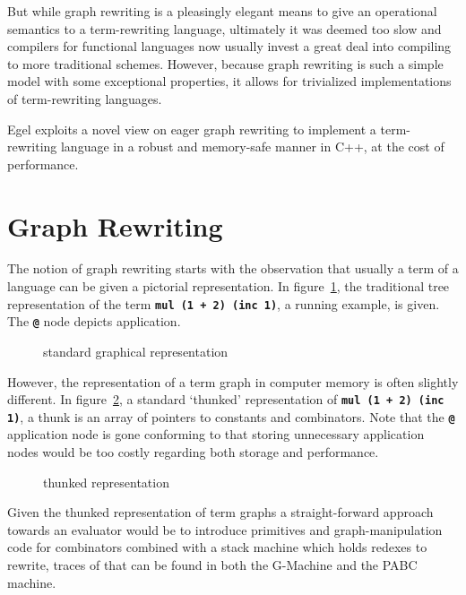 \documentclass{research4cacm}
\newcommand{\code}[1]{{\bf\texttt{#1}}}
\begin{document}
But while graph rewriting is a pleasingly elegant means to give an
operational semantics to a term-rewriting language, ultimately it
was deemed too slow and compilers for functional languages now
usually invest a great deal into compiling to more traditional
schemes.
However, because graph rewriting is such a simple model with
some exceptional properties, it allows for trivialized implementations
of term-rewriting languages.

Egel exploits a novel view on eager graph rewriting to implement
a term-rewriting language in a robust and memory-safe manner in
C++, at the cost of performance.

\section{Graph Rewriting}

The notion of graph rewriting starts with the observation that usually
a term of a language can be given a pictorial representation.
In figure~\ref{figure:termA}, the traditional tree representation of
the term \code{mul (1 + 2) (inc 1)}, a running example, is given. 
The \code{@} node depicts application.

\begin{figure}[h]
\begin{center}
\caption{standard graphical representation}
\label{figure:termA}
\end{center}
\end{figure}

However, the representation of a term graph in computer memory is often
slightly different. In figure~\ref{figure:termB}, a standard `thunked'
representation of \code{mul (1 + 2) (inc 1)}, a thunk is an array
of pointers to constants and combinators.
Note that the \code{@} application node is gone conforming to
that storing unnecessary application nodes would be too 
costly regarding both storage and performance.

\begin{figure}[h]
\begin{center}
\caption{thunked representation}
\label{figure:termB}
\end{center}
\end{figure}

Given the thunked representation of term graphs a straight-forward
approach towards an evaluator would be to introduce primitives
and graph-manipulation code for combinators combined with a stack machine 
which holds redexes to rewrite, traces of that can be found in 
both the G-Machine and the PABC machine.
\end{document}
